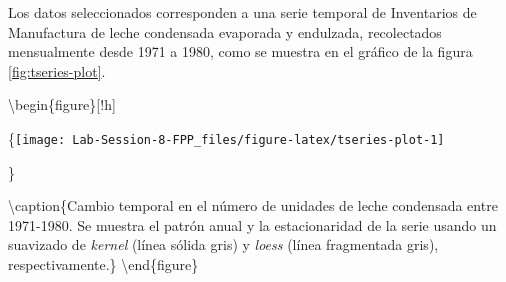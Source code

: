 \documentclass[]{article}
\newenvironment{Shaded}{\begin{snugshade}}{\end{snugshade}}
\newcommand{\CommentTok}[1]{\textcolor[rgb]{0.56,0.35,0.01}{\textit{#1}}}
\newcommand{\DataTypeTok}[1]{\textcolor[rgb]{0.13,0.29,0.53}{#1}}
\newcommand{\DecValTok}[1]{\textcolor[rgb]{0.00,0.00,0.81}{#1}}
\newcommand{\KeywordTok}[1]{\textcolor[rgb]{0.13,0.29,0.53}{\textbf{#1}}}
\newcommand{\NormalTok}[1]{#1}
\newcommand{\OperatorTok}[1]{\textcolor[rgb]{0.81,0.36,0.00}{\textbf{#1}}}
\newcommand{\OtherTok}[1]{\textcolor[rgb]{0.56,0.35,0.01}{#1}}
\newcommand{\StringTok}[1]{\textcolor[rgb]{0.31,0.60,0.02}{#1}}
\begin{document}
Los datos seleccionados corresponden a una serie temporal de Inventarios de Manufactura de leche condensada evaporada y endulzada, recolectados mensualmente desde 1971 a 1980, como se muestra en el gráfico de la figura \ref{fig:tseries-plot}.

\begin{Shaded}
\end{Shaded}

\textbackslash{}begin\{figure\}{[}!h{]}

\{\centering \texttt{[image: Lab-Session-8-FPP\_files/figure-latex/tseries-plot-1]}

\}

\textbackslash{}caption\{Cambio temporal en el número de unidades de leche condensada entre 1971-1980. Se muestra el patrón anual y la estacionaridad de la serie usando un suavizado de \emph{kernel} (línea sólida gris) y \emph{loess} (línea fragmentada gris), respectivamente.\}\label{fig:tseries-plot}
\textbackslash{}end\{figure\}
\end{document}
